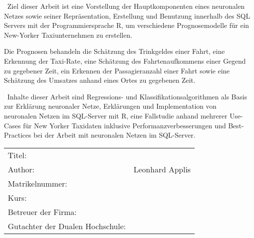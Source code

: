 ~\newline Ziel dieser Arbeit ist eine Vorstellung der Hauptkomponenten eines neuronalen Netzes sowie seiner Repräsentation, Erstellung und Benutzung innerhalb des SQL Servers mit der Programmiersprache R, um verschiedene Prognosemodelle für ein New-Yorker Taxiunternehmen zu erstellen.

Die Prognosen behandeln die Schätzung des Trinkgeldes einer Fahrt, eine Erkennung der Taxi-Rate, eine Schätzung des Fahrtenaufkommens einer Gegend zu gegebener Zeit, ein Erkennen der Passagieranzahl einer Fahrt sowie eine Schätzung des Umsatzes anhand eines Ortes zu gegebenen Zeit.  

~\newline Inhalte dieser Arbeit sind Regressions- und Klassifikationsalgorithmen als Basis zur Erklärung neuronaler Netze, Erklärungen und Implementation von neuronalen Netzen im SQL-Server mit R, eine Fallstudie anhand mehrerer Use-Cases für New Yorker Taxidaten inklusive Performanzverbesserungen und Best-Practices bei der Arbeit mit neuronalen Netzen im SQL-Server.
~\newline
~\newline
\begin{flushleft}
	\begin{tabular}{ll}
		Titel:& \quad \titel \\ 
		Author:& \quad Leonhard Applis \\
		Matrikelnummer: & \quad \matrikelnr  \\
		Kurs: & \quad \kurs \\ 
		Betreuer der Firma: & \quad \betreuerfirma \\	Gutachter der Dualen Hochschule: & \quad \betreuerdhbw \\ 
		[6ex]%
	\end{tabular} 
\end{flushleft}